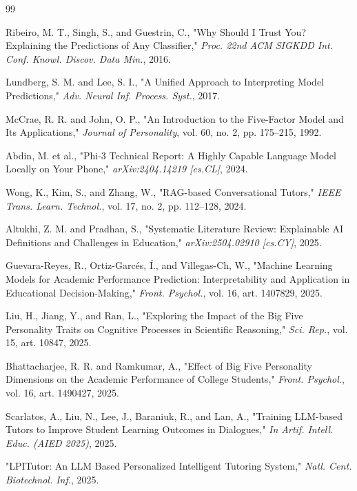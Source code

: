\documentclass[conference]{IEEEtran}
\begin{document}
\begin{thebibliography}{99}

 Ribeiro, M. T., Singh, S., and Guestrin, C., "Why Should I Trust You? Explaining the Predictions of Any Classifier," \textit{Proc. 22nd ACM SIGKDD Int. Conf. Knowl. Discov. Data Min.}, 2016.

 Lundberg, S. M. and Lee, S. I., "A Unified Approach to Interpreting Model Predictions," \textit{Adv. Neural Inf. Process. Syst.}, 2017.

 McCrae, R. R. and John, O. P., "An Introduction to the Five-Factor Model and Its Applications," \textit{Journal of Personality}, vol. 60, no. 2, pp. 175–215, 1992.

 Abdin, M. et al., "Phi-3 Technical Report: A Highly Capable Language Model Locally on Your Phone," \textit{arXiv:2404.14219 [cs.CL]}, 2024.

 Wong, K., Kim, S., and Zhang, W., "RAG-based Conversational Tutors," \textit{IEEE Trans. Learn. Technol.}, vol. 17, no. 2, pp. 112–128, 2024.

 Altukhi, Z. M. and Pradhan, S., "Systematic Literature Review: Explainable AI Definitions and Challenges in Education," \textit{arXiv:2504.02910 [cs.CY]}, 2025.

 Guevara-Reyes, R., Ortiz-Garcés, Í., and Villegas-Ch, W., "Machine Learning Models for Academic Performance Prediction: Interpretability and Application in Educational Decision-Making," \textit{Front. Psychol.}, vol. 16, art. 1407829, 2025.

 Liu, H., Jiang, Y., and Ran, L., "Exploring the Impact of the Big Five Personality Traits on Cognitive Processes in Scientific Reasoning," \textit{Sci. Rep.}, vol. 15, art. 10847, 2025.

 Bhattacharjee, R. R. and Ramkumar, A., "Effect of Big Five Personality Dimensions on the Academic Performance of College Students," \textit{Front. Psychol.}, vol. 16, art. 1490427, 2025.

 Scarlatos, A., Liu, N., Lee, J., Baraniuk, R., and Lan, A., "Training LLM-based Tutors to Improve Student Learning Outcomes in Dialogues," \textit{In Artif. Intell. Educ. (AIED 2025)}, 2025.

 "LPITutor: An LLM Based Personalized Intelligent Tutoring System," \textit{Natl. Cent. Biotechnol. Inf.}, 2025.


\end{thebibliography}
\end{document}
